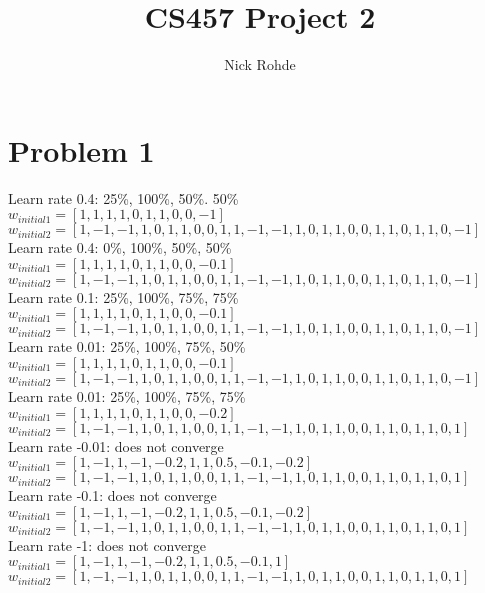 \documentclass{article}
\title{CS457 Project 2}
\author{Nick Rohde}
\begin{document}
\maketitle


\section{Problem 1}

Learn rate 0.4: 25\%, 100\%, 50\%. 50\%\\
$w_{initial1} = [1,1,1,1,0,1,1,0,0,-1]$\\
$w_{initial2} = [1,-1,-1,1,0,1,1,0,0,1,1,-1,-1,1,0,1,1,0,0,1,1,0,1,1,0,-1]$\\

Learn rate 0.4: 0\%, 100\%, 50\%, 50\%\\
$w_{initial1} = [1,1,1,1,0,1,1,0,0,-0.1]$\\
$w_{initial2} = [1,-1,-1,1,0,1,1,0,0,1,1,-1,-1,1,0,1,1,0,0,1,1,0,1,1,0,-1]$\\

Learn rate 0.1: 25\%, 100\%, 75\%, 75\%\\
$w_{initial1} = [1,1,1,1,0,1,1,0,0,-0.1]$\\
$w_{initial2} = [1,-1,-1,1,0,1,1,0,0,1,1,-1,-1,1,0,1,1,0,0,1,1,0,1,1,0,-1]$\\

Learn rate 0.01: 25\%, 100\%, 75\%, 50\%\\
$w_{initial1} = [1,1,1,1,0,1,1,0,0,-0.1]$\\
$w_{initial2} = [1,-1,-1,1,0,1,1,0,0,1,1,-1,-1,1,0,1,1,0,0,1,1,0,1,1,0,-1]$\\

Learn rate 0.01: 25\%, 100\%, 75\%, 75\%\\
$w_{initial1} = [1,1,1,1,0,1,1,0,0,-0.2]$\\
$w_{initial2} = [1,-1,-1,1,0,1,1,0,0,1,1,-1,-1,1,0,1,1,0,0,1,1,0,1,1,0,1]$\\

Learn rate -0.01: does not converge\\
$w_{initial1} = [1,-1,1,-1,-0.2,1,1,0.5,-0.1,-0.2]$\\
$w_{initial2} = [1,-1,-1,1,0,1,1,0,0,1,1,-1,-1,1,0,1,1,0,0,1,1,0,1,1,0,1]$\\

Learn rate -0.1: does not converge\\
$w_{initial1} = [1,-1,1,-1,-0.2,1,1,0.5,-0.1,-0.2]$\\
$w_{initial2} = [1,-1,-1,1,0,1,1,0,0,1,1,-1,-1,1,0,1,1,0,0,1,1,0,1,1,0,1]$\\

Learn rate -1: does not converge\\
$w_{initial1} = [1,-1,1,-1,-0.2,1,1,0.5,-0.1,1]$\\
$w_{initial2} = [1,-1,-1,1,0,1,1,0,0,1,1,-1,-1,1,0,1,1,0,0,1,1,0,1,1,0,1]$\\
\end{document}
